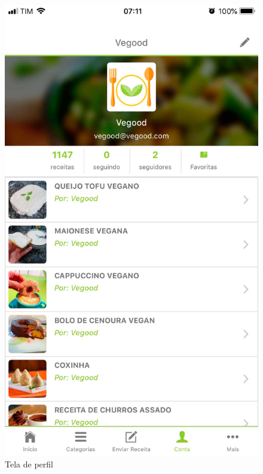 \begin{figure}[H]
	\caption{\label{fig:tela-de-6}Tela de perfil}
	\centering
	\includegraphics[scale=0.15]{imagens/figura17.jpg}
\end{figure}
